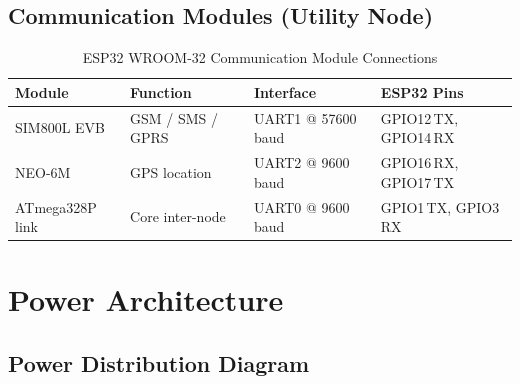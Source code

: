 \documentclass[12pt,a4paper]{article}
\begin{document}
\subsection{Communication Modules (Utility Node)}

\begin{table}[H]
\centering
\begin{tabular}{@{} L{3cm} L{3.5cm} L{3.5cm} L{3cm} @{}}
\toprule
\textbf{Module}   & \textbf{Function}  & \textbf{Interface}       & \textbf{ESP32 Pins}        \\
\midrule
SIM800L EVB       & GSM / SMS / GPRS   & UART1 @ 57600\,baud      & GPIO12\,TX, GPIO14\,RX     \\
NEO-6M            & GPS location       & UART2 @ 9600\,baud       & GPIO16\,RX, GPIO17\,TX     \\
ATmega328P link   & Core inter-node    & UART0 @ 9600\,baud       & GPIO1\,TX, GPIO3\,RX       \\
\bottomrule
\end{tabular}
\caption{ESP32 WROOM-32 Communication Module Connections}
\end{table}

\section{Power Architecture}

\subsection{Power Distribution Diagram}
\end{document}
